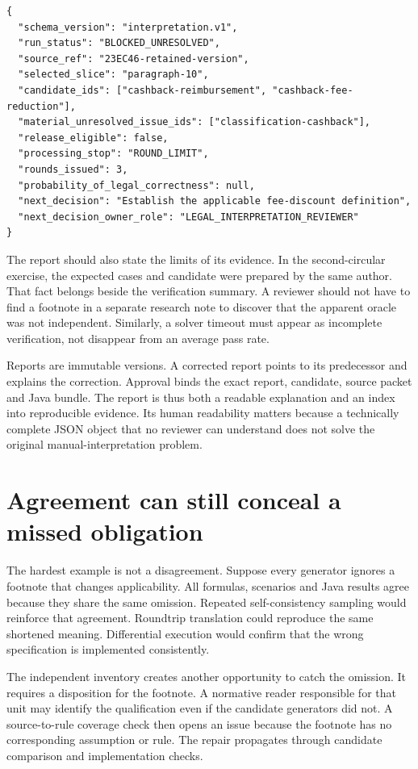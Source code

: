 \documentclass[12pt,a4paper,oneside,openany]{book}
\begin{document}
\begin{lstlisting}[caption={A blocked result preserves alternatives and the next decision.}]
{
  "schema_version": "interpretation.v1",
  "run_status": "BLOCKED_UNRESOLVED",
  "source_ref": "23EC46-retained-version",
  "selected_slice": "paragraph-10",
  "candidate_ids": ["cashback-reimbursement", "cashback-fee-reduction"],
  "material_unresolved_issue_ids": ["classification-cashback"],
  "release_eligible": false,
  "processing_stop": "ROUND_LIMIT",
  "rounds_issued": 3,
  "probability_of_legal_correctness": null,
  "next_decision": "Establish the applicable fee-discount definition",
  "next_decision_owner_role": "LEGAL_INTERPRETATION_REVIEWER"
}
\end{lstlisting}

The report should also state the limits of its evidence. In the second-circular
exercise, the expected cases and candidate were prepared by the same author.
That fact belongs beside the verification summary. A reviewer should not have to
find a footnote in a separate research note to discover that the apparent oracle
was not independent. Similarly, a solver timeout must appear as incomplete
verification, not disappear from an average pass rate.

Reports are immutable versions. A corrected report points to its predecessor and
explains the correction. Approval binds the exact report, candidate, source
packet and Java bundle. The report is thus both a readable explanation and an
index into reproducible evidence. Its human readability matters because a
technically complete JSON object that no reviewer can understand does not solve
the original manual-interpretation problem.

\section{Agreement can still conceal a missed obligation}
\label{merge:M06:23}


The hardest example is not a disagreement. Suppose every generator ignores a
footnote that changes applicability. All formulas, scenarios and Java results
agree because they share the same omission. Repeated self-consistency sampling
would reinforce that agreement. Roundtrip translation could reproduce the same
shortened meaning. Differential execution would confirm that the wrong
specification is implemented consistently.

The independent inventory creates another opportunity to catch the omission. It
requires a disposition for the footnote. A normative reader responsible for that
unit may identify the qualification even if the candidate generators did not.
A source-to-rule coverage check then opens an issue because the footnote has no
corresponding assumption or rule. The repair propagates through candidate
comparison and implementation checks.
\end{document}
